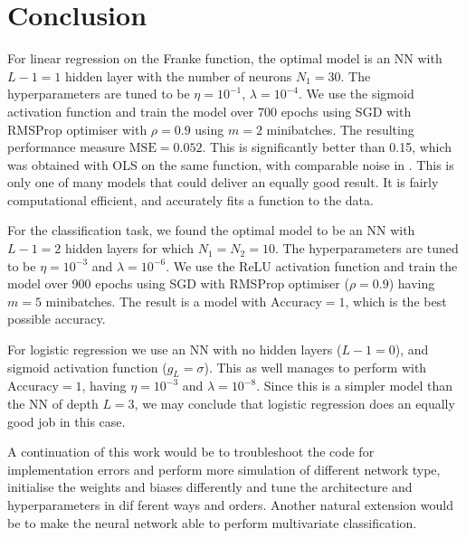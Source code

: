\section{Conclusion}\label{sec:conclusion}

For linear regression on the Franke function, the optimal model is an NN with $L-1=1$ hidden layer with the number of neurons $N_1=30$. The hyperparameters are tuned to be $\eta=10^{-1}$, $\lambda=10^{-4}$. We use the sigmoid activation function and train the model over 700 epochs using SGD with RMSProp optimiser with $\rho=0.9$ using $m=2$ minibatches. The resulting performance measure $\mathrm{MSE} = 0.052$. This is significantly better than 0.15, which was obtained with OLS on the same function, with comparable noise in \projectOne. This is only one of many models that could deliver an equally good result. It is fairly computational efficient, and accurately fits a function to the data. 

For the classification task, we found the optimal model to be an NN with $L-1=2$ hidden layers for which $N_1=N_2=10$. The hyperparameters are tuned to be $\eta=10^{-3}$ and $\lambda=10^{-6}$. We use the ReLU activation function and train the model over 900 epochs using SGD with RMSProp optimiser ($\rho=0.9$) having $m=5$ minibatches. The result is a model with $\mathrm{Accuracy}=1$, which is the best possible accuracy. 

For logistic regression we use an NN with no hidden layers ($L-1=0$), and sigmoid activation function ($g_L=\sigma$). This as well manages to perform with $\mathrm{Accuracy}=1$, having $\eta=10^{-3}$ and $\lambda=10^{-8}$. Since this is a simpler model than the NN of depth $L=3$, we may conclude that logistic regression does an equally good job in this case. 

A continuation of this work would be to troubleshoot the code for implementation errors and perform more simulation of different network type, initialise the weights and biases differently and tune the architecture and hyperparameters in dif ferent ways and orders. Another natural extension would be to make the neural network able to perform multivariate classification. 